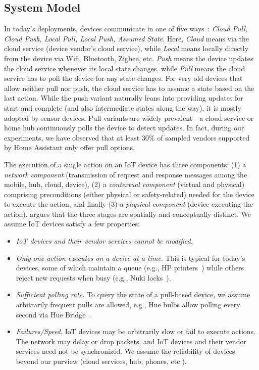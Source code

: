\subsection{System Model}
\label{rasc:sec:model}


In today's deployments, devices communicate in one of five ways~\cite{HAdevicemodels}:
{\it Cloud Pull, Cloud Push, Local Pull, Local Push, Assumed State}. Here, {\it Cloud} means via the cloud service (device vendor's cloud service), while {\it Local} means locally directly from the device via Wifi, Bluetooth, Zigbee, etc. {\it Push} means the device updates the cloud service whenever its local state changes, while {\it Pull} means the cloud service has to poll the device for any state changes. For very old devices that allow neither pull nor push, the cloud service has to assume a state based on the last action. While the push variant naturally leans into providing updates for start and complete (and also intermediate states along the way), it is mostly adopted by sensor devices. Pull variants are widely prevalent---a cloud service or home hub continuously polls the device to detect updates. In fact, during our experiments, we have observed that at least 30\% of sampled vendors supported by Home Assistant only offer pull options.

The execution of a single action on an IoT device has three components: (1) a {\it network component} (transmission of request and response messages among the mobile, hub, cloud, device), (2) a {\it contextual component} (virtual and physical) comprising preconditions (either physical or safety-related) needed for the device to execute the action, and finally (3) a {\it physical component} (device executing the action). \abs{} 
argues that the three stages are spatially and conceptually distinct.
We assume IoT devices satisfy a few  properties: 

\begin{itemize}
    \item {\it IoT devices and their vendor services cannot be modified.}
    \item {\it Only one action executes on a device at a time.} This is typical for today's devices, some of which maintain a queue (e.g., HP printers~\cite{HP_PrintJobStuck_Queue})
    while others reject new requests when busy (e.g., Nuki locks~\cite{Nuki423Locked}).
    \item {\it Sufficient polling rate.} To query the state of a pull-based device, we assume arbitrarily frequent pulls are allowed, e.g., Hue bulbs allow polling every second via Hue Bridge~\cite{HAHueRateLimit}. 
    \item {\it Failures/Speed.} IoT devices may be arbitrarily slow or fail to execute actions. The network may delay or drop packets, and IoT devices and their vendor services need not be synchronized. 
    We assume the reliability of devices beyond our purview (cloud services, hub, phones, etc.).
\end{itemize}
